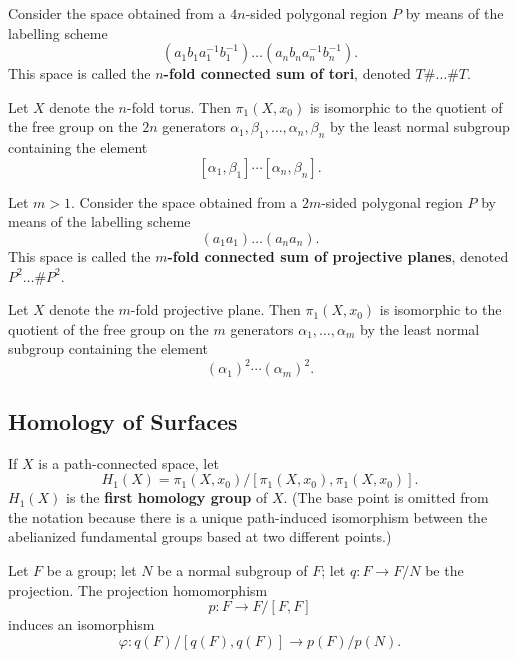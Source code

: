 \begin{definition}
    Consider the space obtained from a $4n$-sided polygonal region $P$ by means of the labelling scheme
    \[
        (a_1b_1a_1^{-1}b_1^{-1}) \dots (a_nb_na_n^{-1}b_n^{-1}).
    \]
    This space is called the \textbf{$n$-fold connected sum of tori}, denoted $T \# \dots \# T$.
\end{definition}
    
\begin{theorem}
Let $X$ denote the $n$-fold torus. Then $\pi_1(X, x_0)$ is isomorphic to the quotient of the free group on the $2n$ generators $\alpha_1, \beta_1, \dots, \alpha_n, \beta_n$ by the least normal subgroup containing the element
\[
    [\alpha_1, \beta_1] \cdots [\alpha_n, \beta_n]. 
\]
\end{theorem}

\begin{definition}
Let $m > 1$. Consider the space obtained from a $2m$-sided polygonal region $P$ by means of the labelling scheme
\[
    (a_1a_1) \dots (a_na_n).
\]
This space is called the \textbf{$m$-fold connected sum of projective planes}, denoted $P^2 \dots \# P^2$.
\end{definition}

\begin{theorem}
Let $X$ denote the $m$-fold projective plane. Then $\pi_1(X, x_0)$ is isomorphic to the quotient of the free group on the $m$ generators $\alpha_1, \dots, \alpha_m$ by the least normal subgroup containing the element
\[
    (\alpha_1)^2\cdots (\alpha_m)^2.
\]
\end{theorem}
    
\subsection{Homology of Surfaces}

\begin{definition}
If $X$ is a path-connected space, let 
\[
    H_1(X) = \pi_1(X, x_0) / [\pi_1(X, x_0), \pi_1(X, x_0)].
\]
$H_1(X)$ is the \textbf{first homology group} of $X$. (The base point is omitted from the notation because there is a unique path-induced isomorphism between
the abelianized fundamental groups based at two different points.)
\end{definition}

\begin{theorem}
Let $F$ be a group; let $N$ be a normal subgroup of $F$; let $q\colon F \rightarrow F/N$ be the projection. The projection homomorphism
\[
    p\colon F \rightarrow F/[F, F]
\]
induces an isomorphism 
\[
    \varphi\colon q(F)/[q(F), q(F)] \rightarrow p(F) / p(N).
\]
\end{theorem}

